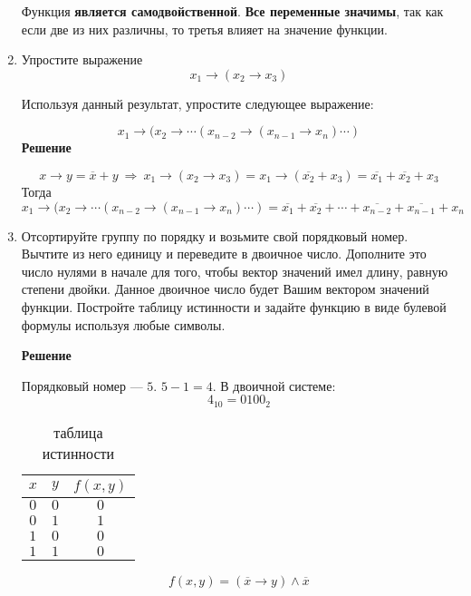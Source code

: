 \documentclass[12pt]{article}
\begin{document}
\begin{enumerate}[label={\textbf{\arabic{section}.\arabic*}}]
		Функция \textbf{является самодвойственной}. \textbf{Все переменные значимы}, так как если две из них различны, то третья влияет на значение функции.
		\item Упростите выражение 
		\[x_1\rightarrow (x_2\rightarrow x_3)\]
		
		Используя данный результат, упростите следующее выражение:
		
		\[x_1\rightarrow(x_2\rightarrow\cdots(x_{n-2}\rightarrow(x_{n-1}\rightarrow x_n)\cdots)\]
		\textbf{Решение}
		
		$$
		x \rightarrow y = \overline{x} + y~\Rightarrow~x_1\rightarrow (x_2\rightarrow x_3) = x_1 \rightarrow (\overline{x_2} + x_3) = \overline{x_1} + \overline{x_2} + x_3
		$$
		Тогда
		$$
		x_1\rightarrow(x_2\rightarrow\cdots(x_{n-2}\rightarrow(x_{n-1}\rightarrow x_n)\cdots) = \overline{x_1} + \overline{x_2} +\cdots+\overline{x_{n-2}} + \overline{x_{n-1}} + x_n
		$$
		\item Отсортируйте группу по порядку и возьмите свой порядковый номер. Вычтите из него единицу и переведите в двоичное число. Дополните это число нулями в начале для того, чтобы вектор значений имел длину, равную степени двойки. Данное двоичное число будет Вашим вектором значений функции. Постройте таблицу истинности и задайте функцию в виде булевой формулы используя любые символы.
		
		\textbf{Решение}
		
		Порядковый номер --- $5$. $5-1=4$. В двоичной системе:
		$$
		4_{10} = 0100_2
		$$
		\vspace{-20pt}
		\begin{table}[h]
			\centering
			\begin{tabular}{|c|c|c|} \hline
				$x$ & $y$ & $f(x, y)$ \\ \hline
				$0$ & $0$ & $0$ \\
				$0$ & $1$ & $1$ \\
				$1$ & $0$ & $0$ \\
				$1$ & $1$ & $0$ \\ \hline
			\end{tabular}
			\caption{таблица истинности}
			\label{table1.8.1}
		\end{table}
		$$
		f(x,y) = (\overline{x} \rightarrow y) \wedge \overline{x}
		$$
	\end{enumerate}
	\newpage
\end{document}
